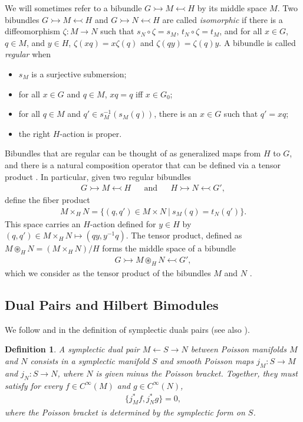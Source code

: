 \documentclass[sn-mathphys,Numbered]{sn-jnl}
\newtheorem{definition}{Definition}%
\begin{document}
We will sometimes refer to a bibundle $G\rightarrowtail M \leftarrowtail H$ by its middle space $M$.  Two bibundles $G\rightarrowtail M\leftarrowtail H$ and $G\rightarrowtail N\leftarrowtail H$ are called \emph{isomorphic} if there is a diffeomorphism $\zeta: M\to N$ such that $s_N\circ \zeta = s_M$, $t_N\circ \zeta = t_M$, and for all $x\in G$, $q\in M$, and $y\in H$, $\zeta(xq) = x\zeta(q)$ and $\zeta(qy) = \zeta(q)y$.  A bibundle is called \emph{regular} when
\begin{itemize}
    \item $s_M$ is a surjective submersion;
    \item for all $x\in G$ and $q\in M$, $xq = q$ iff $x\in G_0$;
    \item for all $q\in M$ and $q'\in s_M^{-1}(s_M(q))$, there is an $x\in G$ such that $q' = xq$;
    \item the right $H$-action is proper.
\end{itemize}
Bibundles that are regular can be thought of as generalized maps from $H$ to $G$, and there is a natural composition operator that can be defined via a tensor product \citep{La01b}.  In particular, given two regular bibundles
\begin{align}
    G\rightarrowtail M\leftarrowtail H && \text{and} && H\rightarrowtail N\leftarrowtail G',
\end{align}
define the fiber product
\begin{align}
    M\times_H N = \Big\{(q,q')\in M\times N\ \Big|\ s_M(q) = t_N(q')\Big\}.
\end{align}
This space carries an $H$-action defined for $y\in H$ by $(q,q')\in M\times_H N\mapsto (qy,y^{-1}q)$.  The tensor product, defined as $M\circledast_H N = (M\times_H N)/H$
forms the middle space of a bibundle
\begin{align}
    G\rightarrowtail M\circledast_H N\leftarrowtail G',
\end{align}
which we consider as the tensor product of the bibundles $M$ and $N$ \citep{La01b,La01c}.
\subsection{Dual Pairs and Hilbert Bimodules}


We follow \citet{We83} and \citet{La01b} in the definition of symplectic duals pairs (see also \citet{Xu91,Xu92,Xu94}).\bigskip

\begin{definition}
    A \emph{symplectic dual pair} $M\leftarrow S\rightarrow N$ between Poisson manifolds $M$ and $N$ consists in a symplectic manifold $S$ and smooth Poisson maps $j_M: S\to M$ and $j_N: S\to N$, where $N$ is given minus the Poisson bracket.  Together, they must satisfy for every $f\in C^\infty(M)$ and $g\in C^\infty(N)$,
    \begin{align}
        \{j^*_Mf,j^*_Ng\} = 0,
    \end{align}
    where the Poisson bracket is determined by the symplectic form on $S$.
\end{definition}\bigskip
\end{document}
